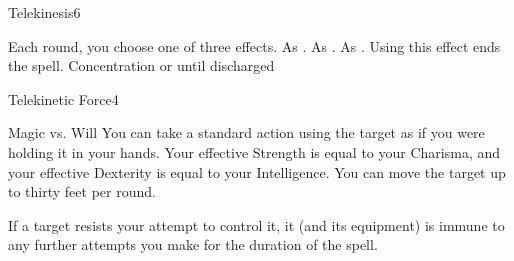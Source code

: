\begin{spellfooter}
\begin{spellsection}{Telekinesis}{6}
    \begin{spellheader}
    \end{spellheader}
    \begin{spellcontent}
        \begin{spelltargetinginfo}
            \spellrng{\rngmed}
        \end{spelltargetinginfo}
        \begin{spelleffects}
            \spellspecial Each round, you choose one of three effects.
             As .
             As .
             As . Using this effect ends the spell.
            \spelldur Concentration or until discharged
        \end{spelleffects}
    \end{spellcontent}
    \begin{spellfooter}
    \end{spellfooter}
\end{spellsection}

\begin{spellsection}{Telekinetic Force}{4}
    \begin{spellheader}
    \end{spellheader}
    \begin{spellcontent}
        \begin{spelltargetinginfo}
        \end{spelltargetinginfo}
        \begin{spelleffects}
            \begin{spellattack}{Magic vs. Will}
                \spellsuccess You can take a standard action using the target as if you were holding it in your hands. Your effective Strength is equal to your Charisma, and your effective Dexterity is equal to your Intelligence. You can move the target up to thirty feet per round.
            \end{spellattack}
        \end{spelleffects}
    \end{spellcontent}
    \begin{spellfooter}
        \spellnotes If a target resists your attempt to control it, it (and its equipment) is immune to any further attempts you make for the duration of the spell.
    \end{spellfooter}
\end{spellsection}


\end{spellfooter}
